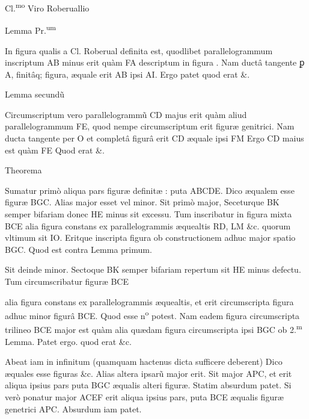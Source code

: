 \documentclass[11pt,a4paper]{article}
\begin{document}
Cl.\textsuperscript{mo} Viro Roberuallio

Lemma Pr.\textsuperscript{um}

In figura qualis a Cl. Roberual definita est, quodlibet parallelogrammum inscriptum AB minus erit quàm FA descriptum in figura . Nam ductâ tangente ꝑ A, finitâq; figura, æquale erit AB ipsi AI. Ergo patet quod erat \&.

Lemma secundũ

Circumscriptum vero parallelogrammũ CD majus erit quàm aliud parallelogrammum FE, quod nempe circumscriptum erit figuræ genitrici. Nam ducta tangente per O et completâ figurâ erit CD æquale ipsi FM Ergo CD maius est quàm FE Quod erat \&.

Theorema

Sumatur primò aliqua pars figuræ definitæ : puta ABCDE. Dico æqualem esse figuræ BGC. Alias major esset vel minor. Sit primò major, Seceturque BK semper bifariam donec HE minus sit excessu. Tum inscribatur in figura mixta BCE alia figura constans ex parallelogrammis æquealtis RD, LM \&c. quorum vltimum sit IO. Eritque inscripta figura ob constructionem adhuc major spatio BGC. Quod est contra Lemma primum.

Sit deinde minor. Sectoque BK semper bifariam repertum sit HE minus defectu. Tum circumscribatur figuræ BCE


alia figura constans ex parallelogrammis æquealtis, et erit circumscripta figura adhuc minor figurâ BCE. Quod esse n\textsuperscript{o} potest. Nam eadem figura circumscripta trilineo BCE major est quàm alia quædam figura circumscripta ipsi BGC ob 2.\textsuperscript{m} Lemma. Patet ergo. quod erat \&c.

Abeat iam in infinitum (quamquam hactenus dicta sufficere deberent) Dico æquales esse figuras \&c. Alias altera ipsarũ major erit. Sit major APC, et erit aliqua ipsius pars puta BGC æqualis alteri figuræ. Statim absurdum patet. Si verò ponatur major ACEF erit aliqua ipsius pars, puta BCE æqualis figuræ genetrici APC. Absurdum iam patet.
\end{document}
